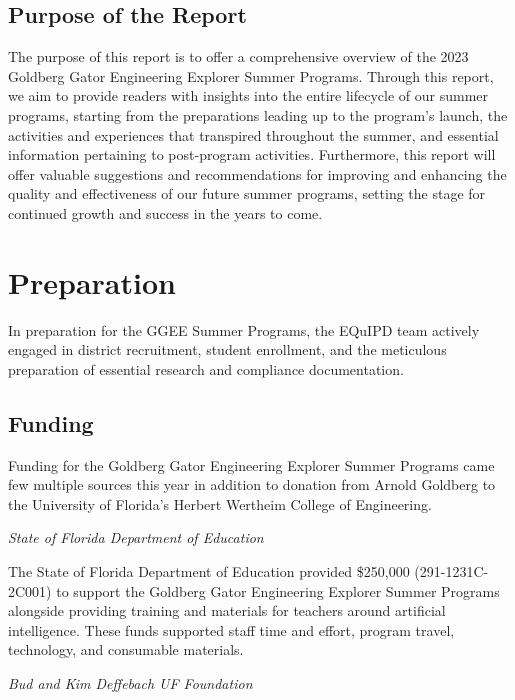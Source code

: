 \documentclass[
]{article}
\begin{document}
\hypertarget{purpose-of-the-report}{%
\subsection{Purpose of the Report}\label{purpose-of-the-report}}

The purpose of this report is to offer a comprehensive overview of the
2023 Goldberg Gator Engineering Explorer Summer Programs. Through this
report, we aim to provide readers with insights into the entire
lifecycle of our summer programs, starting from the preparations leading
up to the program's launch, the activities and experiences that
transpired throughout the summer, and essential information pertaining
to post-program activities. Furthermore, this report will offer valuable
suggestions and recommendations for improving and enhancing the quality
and effectiveness of our future summer programs, setting the stage for
continued growth and success in the years to come.

\hypertarget{preparation}{%
\section{Preparation}\label{preparation}}

In preparation for the GGEE Summer Programs, the EQuIPD team actively
engaged in district recruitment, student enrollment, and the meticulous
preparation of essential research and compliance documentation.

\hypertarget{funding}{%
\subsection{Funding}\label{funding}}

Funding for the Goldberg Gator Engineering Explorer Summer Programs came
few multiple sources this year in addition to donation from Arnold
Goldberg to the University of Florida's Herbert Wertheim College of
Engineering.

\emph{State of Florida Department of Education}

The State of Florida Department of Education provided \$250,000
(291-1231C-2C001) to support the Goldberg Gator Engineering Explorer
Summer Programs alongside providing training and materials for teachers
around artificial intelligence. These funds supported staff time and
effort, program travel, technology, and consumable materials.

\emph{Bud and Kim Deffebach UF Foundation}
\end{document}
